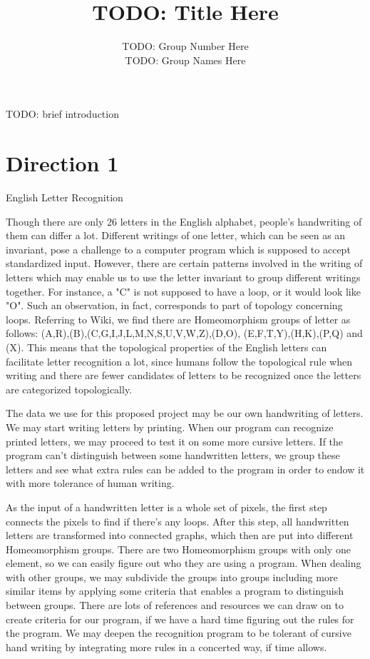 \documentclass[11pt]{article}
\title{TODO: Title Here}
\author{TODO: Group Number Here\\ TODO: Group Names Here}
\begin{document}
\maketitle

TODO: brief introduction

\section{Direction 1}
 English Letter Recognition

Though there are only 26 letters in the English alphabet, people's handwriting of them 
can differ a lot. Different writings of one letter, which can be seen as an invariant, 
pose a challenge to a computer program which is supposed to accept standardized input. 
However, there are certain patterns involved in the writing of letters which may enable 
us to use the letter invariant to group different writings together. For instance, a 
"C" is not supposed to have a loop, or  it would look like "O". Such an observation, in 
fact, corresponds to part of topology concerning loops. Referring to Wiki, we find there 
are Homeomorphism groups of letter as follows: (A,R),(B),(C,G,I,J,L,M,N,S,U,V,W,Z),(D,O),
(E,F,T,Y),(H,K),(P,Q) and (X). This means that the topological properties of the English 
letters can facilitate letter recognition a lot, since humans follow the topological rule 
when writing and there are fewer candidates of letters to be recognized once the letters 
are categorized topologically. 

The data we use for this proposed project may be our own handwriting of letters. We may 
start writing letters by printing. When our program can recognize printed letters, we may 
proceed to test it on some more cursive letters. If the program can't distinguish 
between some handwritten letters, we group these letters and see what extra rules can be 
added to the program in order to endow it with more tolerance of human writing.   

As the input of a handwritten letter is a whole set of pixels, the first step connects 
the pixels to find if there's any loops. After this step, all handwritten letters are 
transformed into connected graphs, which then are put into different Homeomorphism 
groups. There are two Homeomorphism groups with only one element, so we can easily 
figure out who they are using a program. When dealing with other groups, we may 
subdivide the groups into groups including more similar items by applying some criteria 
that enables a program to distinguish between groups. There are lots of references 
and resources we can draw on to create criteria for our program, if we have a hard 
time figuring out the rules for the program. We may deepen the recognition program 
to be tolerant of cursive hand writing by integrating more rules in a concerted way, 
if time allows.
\end{document}
